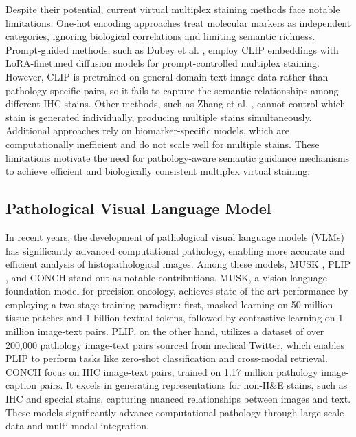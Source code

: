 \documentclass[journal,twoside,web]{ieeecolor}
\newcommand{\revision}[1]{\textcolor{revisioncolor}{#1}}  %
\renewcommand{\revision}[1]{#1}%
\begin{document}
\revision{Despite their potential, current virtual multiplex staining methods face notable limitations. One-hot encoding approaches \cite{lin2022unpaired} treat molecular markers as independent categories, ignoring biological correlations and limiting semantic richness. Prompt-guided methods, such as Dubey et al. \cite{dubey2024vims}, employ CLIP embeddings with LoRA-finetuned diffusion models for prompt-controlled multiplex staining. However, CLIP is pretrained on general-domain text-image data rather than pathology-specific pairs, so it fails to capture the semantic relationships among different IHC stains. Other methods, such as Zhang et al. \cite{zhang2022mvfstain}, cannot control which stain is generated individually, producing multiple stains simultaneously. Additional approaches \cite{liu2022bci,zeng2022semi,li2023adaptive,liu2021unpaired,peng2024advancing,chen2024pathological,guan2025correlated} rely on biomarker-specific models, which are computationally inefficient and do not scale well for multiple stains. These limitations motivate the need for pathology-aware semantic guidance mechanisms to achieve efficient and biologically consistent multiplex virtual staining.}




\subsection{Pathological Visual Language Model}
In recent years, the development of pathological visual language models (VLMs) has significantly advanced computational pathology, enabling more accurate and efficient analysis of histopathological images. {Among these models, MUSK \cite{xiang2025vision}, PLIP \cite{huang2023visual}, and CONCH \cite{lu2024visual} stand out as notable contributions. MUSK, a vision-language foundation model for precision oncology, achieves state-of-the-art performance by employing a two-stage training paradigm: first, masked learning on 50 million tissue patches and 1 billion textual tokens, followed by contrastive learning on 1 million image-text pairs.} PLIP, on the other hand, utilizes a dataset of over 200,000 pathology image-text pairs sourced from medical Twitter, which enables PLIP to perform tasks like zero-shot classification and cross-modal retrieval. CONCH \cite{lu2024visual} focus on IHC image-text pairs, trained on 1.17 million pathology image-caption pairs. It excels in generating representations for non-H\&E stains, such as IHC and special stains, capturing nuanced relationships between images and text. These models significantly advance computational pathology through large-scale data and multi-modal integration.
\end{document}
